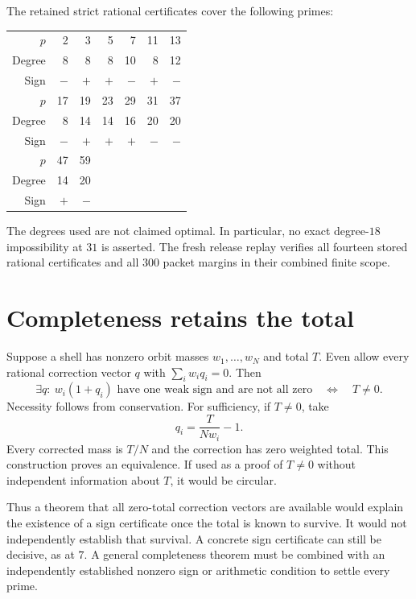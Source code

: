 The retained strict rational certificates cover the following primes:
\begin{center}
\begin{tabular}{rrrrrrr}
\toprule
$p$&2&3&5&7&11&13\\
Degree&8&8&8&10&8&12\\
Sign&$-$&$+$&$+$&$-$&$+$&$-$\\
\midrule
$p$&17&19&23&29&31&37\\
Degree&8&14&14&16&20&20\\
Sign&$-$&$+$&$+$&$+$&$-$&$-$\\
\midrule
$p$&47&59&&&&\\
Degree&14&20&&&&\\
Sign&$+$&$-$&&&&\\
\bottomrule
\end{tabular}
\end{center}
The degrees used are not claimed optimal. In particular, no exact degree-$18$ impossibility at $31$ is asserted. The fresh release replay verifies all fourteen stored rational certificates and all $300$ packet margins in their combined finite scope.


\section{Completeness retains the total}
Suppose a shell has nonzero orbit masses $w_1,\ldots,w_N$ and total $T$. Even allow every rational correction vector $q$ with $\sum_iw_iq_i=0$. Then
\begin{equation}\label{eq:fullsignequiv}
\exists q:\ w_i(1+q_i)\text{ have one weak sign and are not all zero}
\quad\Longleftrightarrow\quad T\ne0.
\end{equation}
Necessity follows from conservation. For sufficiency, if $T\ne0$, take
\[
q_i=\frac{T}{Nw_i}-1.
\]
Every corrected mass is $T/N$ and the correction has zero weighted total. This construction proves an equivalence. If used as a proof of $T\ne0$ without independent information about $T$, it would be circular.

Thus a theorem that all zero-total correction vectors are available would explain the existence of a sign certificate once the total is known to survive. It would not independently establish that survival. A concrete sign certificate can still be decisive, as at $7$. A general completeness theorem must be combined with an independently established nonzero sign or arithmetic condition to settle every prime.
